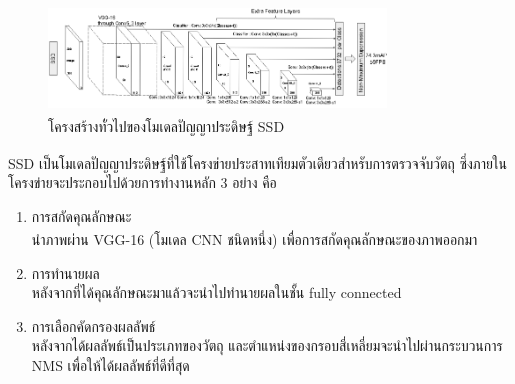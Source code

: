 \begin{figure}[!ht]
	\centering
	\includegraphics[width=0.8\textwidth]{chapter2/images/vgg.jpg}
		\caption[โครงสร้างทั่วไปของโมเดลปัญญาประดิษฐ์ SSD]{โครงสร้างทั่วไปของโมเดลปัญญาประดิษฐ์ SSD\textsuperscript{\cite{ssd_yolo_pic}}}
    	\label{fig:ssd}
\end{figure}

SSD\textsuperscript{\cite{liu2016ssd}} เป็นโมเดลปัญญาประดิษฐ์ที่ใช้โครงข่ายประสาทเทียมตัวเดียวสำหรับการตรวจจับวัตถุ ซึ่งภายในโครงข่ายจะประกอบไปด้วยการทำงานหลัก 3 อย่าง คือ
\begin{enumerate}
	\setlength\itemsep{-0.25em}
	\item การสกัดคุณลักษณะ\\
	นำภาพผ่าน VGG-16\textsuperscript{\cite{vgg}} (โมเดล CNN ชนิดหนึ่ง) เพื่อการสกัดคุณลักษณะของภาพออกมา
	\item การทำนายผล\\
	หลังจากที่ได้คุณลักษณะมาแล้วจะนำไปทำนายผลในชั้น fully connected
	\item การเลือกคัดกรองผลลัพธ์\\
	หลังจากได้ผลลัพธ์เป็นประเภทของวัตถุ และตำแหน่งของกรอบสี่เหลี่ยมจะนำไปผ่านกระบวนการ NMS เพื่อให้ได้ผลลัพธ์ที่ดีที่สุด  
\end{enumerate}

